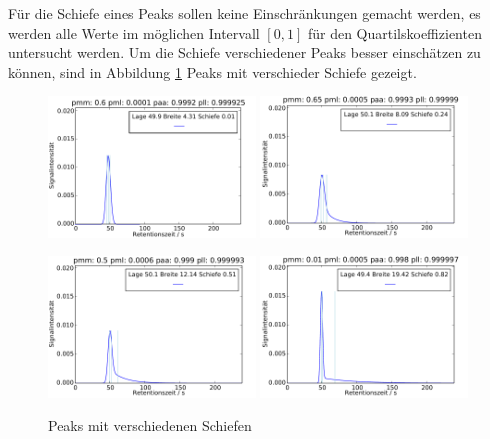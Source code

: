 Für die Schiefe eines Peaks sollen keine Einschränkungen gemacht werden, es werden alle Werte im möglichen Intervall $[0,1]$ für den Quartilskoeffizienten untersucht werden. Um die Schiefe verschiedener Peaks besser einschätzen zu können, sind in Abbildung \ref{diverse_schiefen} Peaks mit verschieder Schiefe gezeigt.

\begin{figure}
 \includegraphics[width=0.49\textwidth]{bilder/Schiefe/001_q}
 \includegraphics[width=0.49\textwidth]{bilder/Schiefe/025_q}

 \vspace{5pt}
 
 \includegraphics[width=0.49\textwidth]{bilder/Schiefe/05_q}
 \includegraphics[width=0.49\textwidth]{bilder/Schiefe/08_q}
\caption{Peaks mit verschiedenen Schiefen}
\label{diverse_schiefen}
\end{figure}


